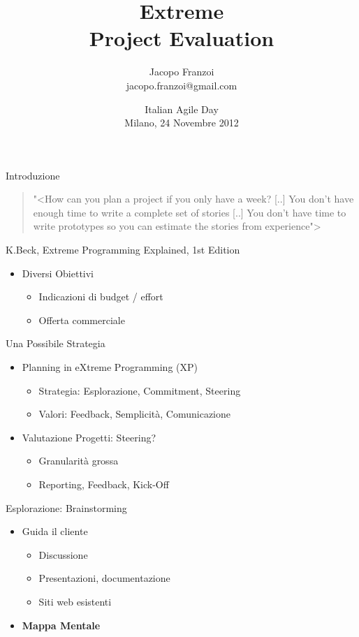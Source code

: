 \documentclass[compress, red, 14pt]{beamer}
\title{ Extreme \\ Project Evaluation }
\author{
	Jacopo Franzoi \\
	{\scriptsize jacopo.franzoi@gmail.com }
}
\date{
	Italian Agile Day \\
	Milano, 24 Novembre 2012
}
\begin{document}
	\begin{frame}
		\titlepage
	\end{frame}

	\begin{frame}{Introduzione}
		\begin{quote}
			{\small "<{How can you plan a project if you only have a week? [..] You don't have enough time to write a complete set of stories [..] You don't have time to write prototypes so you can estimate the stories from experience}">}
		\end{quote}
		\hfill {\scriptsize K.Beck, Extreme Programming Explained, 1st Edition}

		\begin{itemize}
			\item Diversi Obiettivi
			\begin{itemize}
				\item Indicazioni di budget / effort
				\item Offerta commerciale
			\end{itemize}
		\end{itemize}
	\end{frame}


	\begin{frame}{Una Possibile Strategia}
		\begin{itemize}
			\item Planning in eXtreme Programming (XP)
			\begin{itemize}
				\item Strategia: Esplorazione, Commitment, Steering
				\item Valori: Feedback, Semplicità, Comunicazione
			\end{itemize}

			\item Valutazione Progetti: Steering?
			\begin{itemize}
				\item Granularità grossa
				\item Reporting, Feedback, Kick-Off
			\end{itemize}

		\end{itemize}
	\end{frame}


	\begin{frame}{Esplorazione: Brainstorming}
		\begin{itemize}
			\item Guida il cliente
			\begin{itemize}
				\item Discussione
				\item Presentazioni, documentazione
				\item Siti web esistenti
			\end{itemize}
		\end{itemize}	

		\begin{itemize}
			\item \textbf{Mappa Mentale}
		\end{itemize}

	\end{frame}
\end{document}
